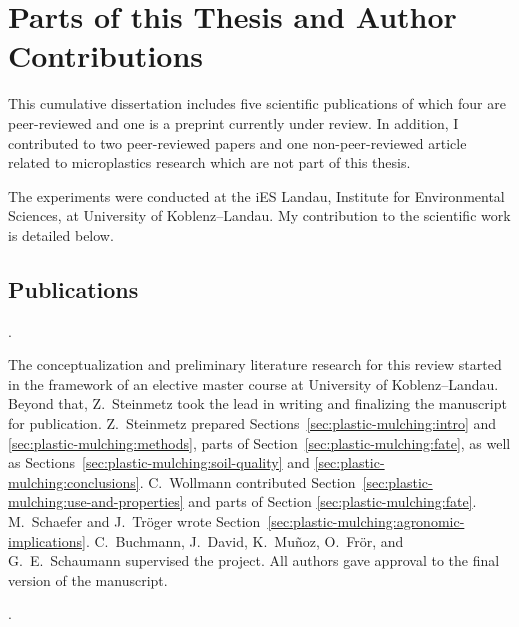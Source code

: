 
\chapter{Parts of this Thesis and Author Contributions}
\label{ch:author-contributions}

This cumulative dissertation includes five scientific publications of which four are peer-reviewed and one is a preprint currently under review. In addition, I contributed to two peer-reviewed papers and one non-peer-reviewed article related to microplastics research which are not part of this thesis.

The experiments were conducted at the iES Landau, Institute for Environmental Sciences, at University of Koblenz--Landau. My contribution to the scientific work is detailed below.

\section*{Publications}

\vspace{0.5\baselineskip}
\noindent{}.

\begin{description}
	\setlength\itemsep{0em}
	\item[Author contributions:] The conceptualization and preliminary literature research for this review started in the framework of an elective master course at University of Koblenz--Landau. Beyond that, Z.~Steinmetz took the lead in writing and finalizing the manuscript for publication. Z.~Steinmetz prepared Sections~\ref{sec:plastic-mulching:intro} and \ref{sec:plastic-mulching:methods}, parts of Section~\ref{sec:plastic-mulching:fate}, as well as Sections~\ref{sec:plastic-mulching:soil-quality} and \ref{sec:plastic-mulching:conclusions}. C.~Wollmann contributed Section~\ref{sec:plastic-mulching:use-and-properties} and parts of Section \ref{sec:plastic-mulching:fate}. M.~Schaefer and J.~Tröger wrote Section~\ref{sec:plastic-mulching:agronomic-implications}. C.~Buchmann, J.~David, K.~Muñoz, O.~Frör, and G.~E.~Schaumann supervised the project. All authors gave approval to the final version of the manuscript.
\end{description}

\vspace{0.5\baselineskip}
\noindent{}.

